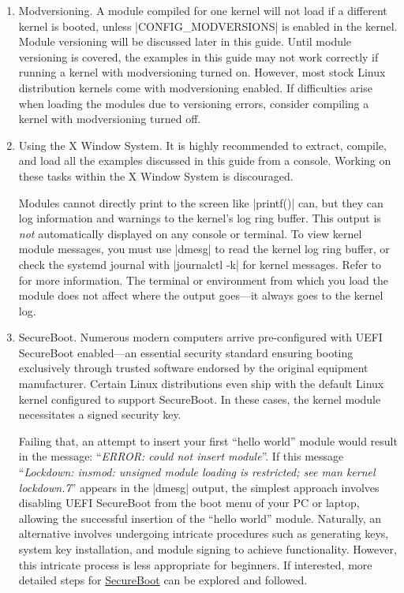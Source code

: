 \documentclass[10pt, oneside]{book}
\begin{document}
\begin{enumerate}
  \item Modversioning.
        A module compiled for one kernel will not load if a different kernel is booted,
        unless \cpp|CONFIG_MODVERSIONS| is enabled in the kernel.
        Module versioning will be discussed later in this guide.
        Until module versioning is covered, the examples in this guide may not work correctly if running a kernel with modversioning turned on.
        However, most stock Linux distribution kernels come with modversioning enabled.
        If difficulties arise when loading the modules due to versioning errors, consider compiling a kernel with modversioning turned off.

  \item Using the X Window System.
        It is highly recommended to extract, compile, and load all the examples discussed in this guide from a console.
        Working on these tasks within the X Window System is discouraged.

        Modules cannot directly print to the screen like \cpp|printf()| can,
        but they can log information and warnings to the kernel's log ring buffer.
        This output is \emph{not} automatically displayed on any console or terminal.
        To view kernel module messages, you must use \sh|dmesg| to read the kernel log ring buffer,
        or check the systemd journal with \sh|journalctl -k| for kernel messages.
        Refer to  for more information.
        The terminal or environment from which you load the module does not affect where the output goes—it always goes to the kernel log.
  \item SecureBoot.
        Numerous modern computers arrive pre-configured with UEFI SecureBoot enabled—an essential security standard ensuring booting exclusively through trusted software endorsed by the original equipment manufacturer.
        Certain Linux distributions even ship with the default Linux kernel configured to support SecureBoot.
        In these cases, the kernel module necessitates a signed security key.

        Failing that, an attempt to insert your first ``hello world'' module would result in the message: ``\emph{ERROR: could not insert module}''.
        If this message ``\emph{Lockdown: insmod: unsigned module loading is restricted;
        see man kernel lockdown.7}'' appears in the \sh|dmesg| output,
        the simplest approach involves disabling UEFI SecureBoot from the boot menu of your PC or laptop,
        allowing the successful insertion of the ``hello world'' module.
        Naturally, an alternative involves undergoing intricate procedures such as generating keys, system key installation,
        and module signing to achieve functionality.
        However, this intricate process is less appropriate for beginners. If interested,
        more detailed steps for \href{https://wiki.debian.org/SecureBoot}{SecureBoot} can be explored and followed.
\end{enumerate}
\end{document}
